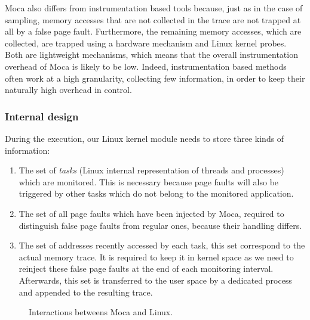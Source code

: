 \gls{Moca} also differs from instrumentation based tools because, just as in the case of sampling, memory accesses that are not collected in the trace are not trapped at all by a false page fault.
Furthermore, the remaining memory accesses, which are collected, are trapped using a hardware mechanism and Linux kernel probes.
Both are lightweight mechanisms, which means that the overall instrumentation overhead of \gls{Moca} is likely to be low.
Indeed, instrumentation based methods often work at a high granularity, collecting few information, in order to keep their naturally high overhead in control.

\subsubsection{Internal design}

During the execution, our \gls{Linux} kernel module needs to store three kinds of information:

\begin{enumerate}
    \item The set of \emph{tasks} (Linux internal representation of threads and processes) which are
monitored.
    This is necessary because page faults will also be triggered by other tasks which do not belong to
    the monitored application.
    \item The set of all page faults which have been injected by \gls{Moca}, required to distinguish false page faults from regular ones, because their handling differs.
    \item The set of addresses recently accessed by each task, this set correspond to the actual memory trace.
        It is required to keep it in kernel space as we need to reinject these false page faults at the end of each monitoring interval.
        Afterwards, this set is transferred to the user space by a dedicated process and appended to the resulting trace.
\end{enumerate}

\begin{figure}[htb]
    \centering
    
    \caption{Interactions betweens Moca and Linux.}
    \label{fig:moca}
\end{figure}

